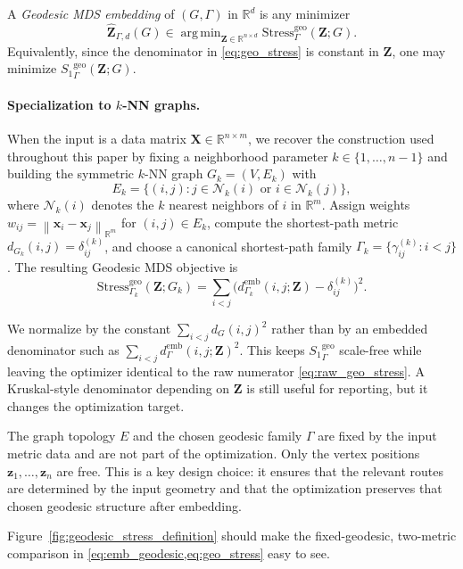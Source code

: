 \documentclass[twoside,11pt]{article}
\newcommand{\R}{\mathbb{R}}
\newcommand{\bx}{\mathbf{x}}
\newcommand{\bX}{\mathbf{X}}
\newcommand{\bz}{\mathbf{z}}
\newcommand{\bZ}{\mathbf{Z}}
\newcommand{\norm}[1]{\left\|#1\right\|}
\newcommand{\demb}{d^{\mathrm{emb}}}
\newcommand{\Gk}{G_k}
\newcommand{\Stress}{\mathrm{Stress}}
\newcommand{\StressOne}{S_1}
\DeclareMathOperator*{\argmin}{arg\,min}
\begin{document}
\begin{definition}
  \label{def:gmds_embedding}
  A \emph{Geodesic MDS embedding} of $(G,\Gamma)$ in $\R^d$ is any
  minimizer
  \begin{equation}
    \hat{\bZ}_{\Gamma,d}(G)
    \in \argmin_{\bZ \in \R^{n \times d}}
    \Stress^{\mathrm{geo}}_{\Gamma}(\bZ; G).
    \label{eq:geo_mds}
  \end{equation}
  Equivalently, since the denominator in \cref{eq:geo_stress} is constant
  in $\bZ$, one may minimize ${\StressOne}_{\Gamma}^{\mathrm{geo}}(\bZ; G)$.
\end{definition}

\paragraph{Specialization to $k$-NN graphs.}
When the input is a data matrix $\bX \in \R^{n \times m}$, we recover the
construction used throughout this paper by fixing a neighborhood parameter
$k \in \{1,\ldots,n-1\}$ and building the symmetric $k$-NN graph
$\Gk = (V, E_k)$ with
\begin{equation}
  E_k = \{(i,j) : j \in \mathcal{N}_k(i) \text{ or } i \in \mathcal{N}_k(j)\},
  \label{eq:knn_edges}
\end{equation}
where $\mathcal{N}_k(i)$ denotes the $k$ nearest neighbors of $i$ in
$\R^m$.  Assign weights $w_{ij} = \norm{\bx_i - \bx_j}_{\R^m}$ for
$(i,j) \in E_k$, compute the shortest-path metric
$d_{\Gk}(i,j) = \delta_{ij}^{(k)}$, and choose a canonical shortest-path
family $\Gamma_k = \{\gamma_{ij}^{(k)} : i < j\}$.  The resulting Geodesic
MDS objective is
\begin{equation}
  \Stress^{\mathrm{geo}}_{\Gamma_k}(\bZ; \Gk)
  = \sum_{i < j}
    \bigl(\demb_{\Gamma_k}(i,j;\bZ) - \delta^{(k)}_{ij}\bigr)^2.
  \label{eq:knn_raw_geo_stress}
\end{equation}

\begin{remark}[Normalization]
  We normalize by the constant $\sum_{i<j} d_G(i,j)^2$ rather than by an
  embedded denominator such as $\sum_{i<j} \demb_{\Gamma}(i,j;\bZ)^2$.
  This keeps ${\StressOne}_{\Gamma}^{\mathrm{geo}}$ scale-free while
  leaving the optimizer identical to the raw numerator
  \cref{eq:raw_geo_stress}.  A Kruskal-style denominator depending on
  $\bZ$ is still useful for reporting, but it changes the optimization
  target.
\end{remark}

\begin{remark}
  The graph topology $E$ and the chosen geodesic family $\Gamma$ are fixed
  by the input metric data and are not part of the optimization.  Only the
  vertex positions $\bz_1,\ldots,\bz_n$ are free.  This is a key design
  choice: it ensures that the relevant routes are determined by the input
  geometry and that the optimization preserves that chosen geodesic
  structure after embedding.
\end{remark}
Figure~\ref{fig:geodesic_stress_definition} should make the fixed-geodesic,
two-metric comparison in \cref{eq:emb_geodesic,eq:geo_stress} easy to see.
\end{document}
